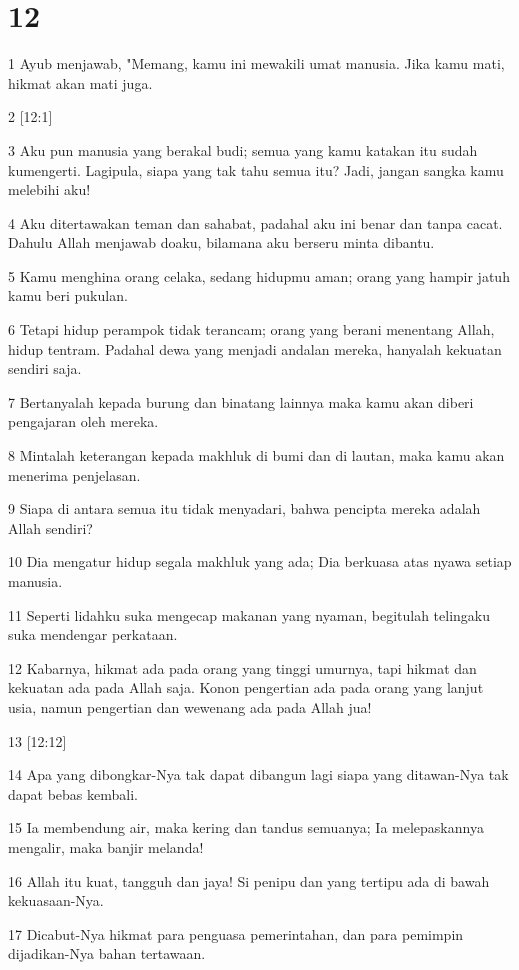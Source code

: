 \chapter{12}

\par 1 Ayub menjawab, "Memang, kamu ini mewakili umat manusia. Jika kamu mati, hikmat akan mati juga.
\par 2 [12:1]
\par 3 Aku pun manusia yang berakal budi; semua yang kamu katakan itu sudah kumengerti. Lagipula, siapa yang tak tahu semua itu? Jadi, jangan sangka kamu melebihi aku!
\par 4 Aku ditertawakan teman dan sahabat, padahal aku ini benar dan tanpa cacat. Dahulu Allah menjawab doaku, bilamana aku berseru minta dibantu.
\par 5 Kamu menghina orang celaka, sedang hidupmu aman; orang yang hampir jatuh kamu beri pukulan.
\par 6 Tetapi hidup perampok tidak terancam; orang yang berani menentang Allah, hidup tentram. Padahal dewa yang menjadi andalan mereka, hanyalah kekuatan sendiri saja.
\par 7 Bertanyalah kepada burung dan binatang lainnya maka kamu akan diberi pengajaran oleh mereka.
\par 8 Mintalah keterangan kepada makhluk di bumi dan di lautan, maka kamu akan menerima penjelasan.
\par 9 Siapa di antara semua itu tidak menyadari, bahwa pencipta mereka adalah Allah sendiri?
\par 10 Dia mengatur hidup segala makhluk yang ada; Dia berkuasa atas nyawa setiap manusia.
\par 11 Seperti lidahku suka mengecap makanan yang nyaman, begitulah telingaku suka mendengar perkataan.
\par 12 Kabarnya, hikmat ada pada orang yang tinggi umurnya, tapi hikmat dan kekuatan ada pada Allah saja. Konon pengertian ada pada orang yang lanjut usia, namun pengertian dan wewenang ada pada Allah jua!
\par 13 [12:12]
\par 14 Apa yang dibongkar-Nya tak dapat dibangun lagi siapa yang ditawan-Nya tak dapat bebas kembali.
\par 15 Ia membendung air, maka kering dan tandus semuanya; Ia melepaskannya mengalir, maka banjir melanda!
\par 16 Allah itu kuat, tangguh dan jaya! Si penipu dan yang tertipu ada di bawah kekuasaan-Nya.
\par 17 Dicabut-Nya hikmat para penguasa pemerintahan, dan para pemimpin dijadikan-Nya bahan tertawaan.

